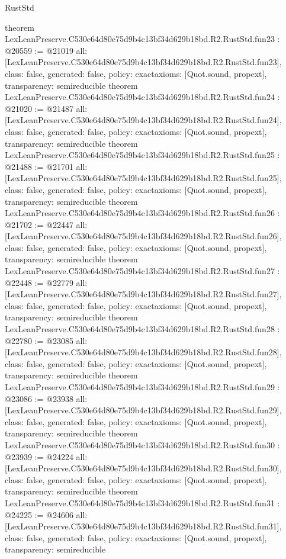 \begin{lexlean}{RustStd}
\begin{coremodule}
{}
theorem LexLeanPreserve.C530e64d80e75d9b4c13bf34d629b18bd.R2.RustStd.fun23 : @20559 := @21019 {
  all: [LexLeanPreserve.C530e64d80e75d9b4c13bf34d629b18bd.R2.RustStd.fun23],
  class: false,
  generated: false,
  policy: exact{axioms: [Quot.sound, propext]},
  transparency: semireducible
}
theorem LexLeanPreserve.C530e64d80e75d9b4c13bf34d629b18bd.R2.RustStd.fun24 : @21020 := @21487 {
  all: [LexLeanPreserve.C530e64d80e75d9b4c13bf34d629b18bd.R2.RustStd.fun24],
  class: false,
  generated: false,
  policy: exact{axioms: [Quot.sound, propext]},
  transparency: semireducible
}
theorem LexLeanPreserve.C530e64d80e75d9b4c13bf34d629b18bd.R2.RustStd.fun25 : @21488 := @21701 {
  all: [LexLeanPreserve.C530e64d80e75d9b4c13bf34d629b18bd.R2.RustStd.fun25],
  class: false,
  generated: false,
  policy: exact{axioms: [Quot.sound, propext]},
  transparency: semireducible
}
theorem LexLeanPreserve.C530e64d80e75d9b4c13bf34d629b18bd.R2.RustStd.fun26 : @21702 := @22447 {
  all: [LexLeanPreserve.C530e64d80e75d9b4c13bf34d629b18bd.R2.RustStd.fun26],
  class: false,
  generated: false,
  policy: exact{axioms: [Quot.sound, propext]},
  transparency: semireducible
}
theorem LexLeanPreserve.C530e64d80e75d9b4c13bf34d629b18bd.R2.RustStd.fun27 : @22448 := @22779 {
  all: [LexLeanPreserve.C530e64d80e75d9b4c13bf34d629b18bd.R2.RustStd.fun27],
  class: false,
  generated: false,
  policy: exact{axioms: [Quot.sound, propext]},
  transparency: semireducible
}
theorem LexLeanPreserve.C530e64d80e75d9b4c13bf34d629b18bd.R2.RustStd.fun28 : @22780 := @23085 {
  all: [LexLeanPreserve.C530e64d80e75d9b4c13bf34d629b18bd.R2.RustStd.fun28],
  class: false,
  generated: false,
  policy: exact{axioms: [Quot.sound, propext]},
  transparency: semireducible
}
theorem LexLeanPreserve.C530e64d80e75d9b4c13bf34d629b18bd.R2.RustStd.fun29 : @23086 := @23938 {
  all: [LexLeanPreserve.C530e64d80e75d9b4c13bf34d629b18bd.R2.RustStd.fun29],
  class: false,
  generated: false,
  policy: exact{axioms: [Quot.sound, propext]},
  transparency: semireducible
}
theorem LexLeanPreserve.C530e64d80e75d9b4c13bf34d629b18bd.R2.RustStd.fun30 : @23939 := @24224 {
  all: [LexLeanPreserve.C530e64d80e75d9b4c13bf34d629b18bd.R2.RustStd.fun30],
  class: false,
  generated: false,
  policy: exact{axioms: [Quot.sound, propext]},
  transparency: semireducible
}
theorem LexLeanPreserve.C530e64d80e75d9b4c13bf34d629b18bd.R2.RustStd.fun31 : @24225 := @24606 {
  all: [LexLeanPreserve.C530e64d80e75d9b4c13bf34d629b18bd.R2.RustStd.fun31],
  class: false,
  generated: false,
  policy: exact{axioms: [Quot.sound, propext]},
  transparency: semireducible
}
\end{coremodule}
\end{lexlean}
